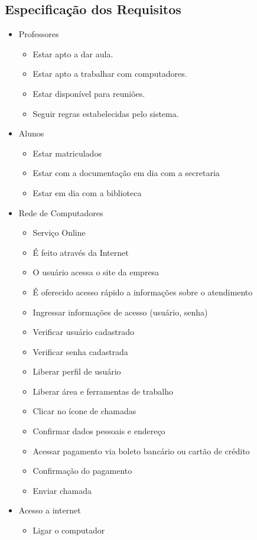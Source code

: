  \subsection{Especificação dos Requisitos}
   \begin{itemize}\item Professores
	\begin{itemize}
	\item Estar apto a dar aula.
	\item Estar apto a trabalhar com computadores.
	\item Estar disponível para reuniões.
	\item Seguir regras estabelecidas pelo sistema.
	\end{itemize}
\item Alunos
	\begin{itemize}
	\item Estar matriculados
	\item Estar com a documentação em dia com a secretaria
	\item Estar em dia com a biblioteca
	\end{itemize}
\item Rede de Computadores
	\begin{itemize}
	\item Serviço Online
	\item É feito através da Internet
	\item O usuário acessa o site da empresa
	\item É oferecido acesso rápido a informações sobre o atendimento
	\item Ingressar informações de acesso (usuário, senha) 
	\item Verificar usuário cadastrado 
	\item Verificar senha cadastrada 
	\item Liberar perfil de usuário 
	\item Liberar área e ferramentas de trabalho
	\item Clicar no ícone de chamadas
	\item Confirmar dados pessoais e endereço
	\item Acessar pagamento via boleto bancário ou cartão de crédito
	\item Confirmação do pagamento
	\item Enviar chamada
	\end{itemize}
\item Acesso a internet
	\begin{itemize}
	\item Ligar o computador

\end{itemize}
\end{itemize}
